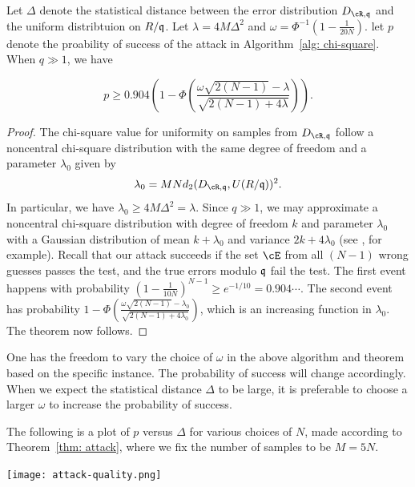 \documentclass{amsart}
\begin{document}
\begin{theorem} \label{thm: attack}
Let $\Delta$ denote the statistical distance between the error distribution $D_{\cR, \fq}$ and the uniform distribtuion on $R/\mathfrak{q}$. Let $\lambda = 4 M \Delta^2$ and $\omega = \Phi^{-1}(1- \frac{1}{20N})$. let $p$ denote the proability of success of the attack in Algorithm~\ref{alg: chi-square}. When $q \gg 1$, we have

$$p \geq 0.904 \left(1- \Phi \left(\frac{\omega \sqrt{2(N-1)}- \lambda}{\sqrt{2(N-1) +4\lambda}}\right) \right).$$
\end{theorem}

\begin{proof}
The chi-square value for uniformity on samples from $D_{\cR, \fq}$ follow a noncentral chi-square distribution with the same degree of freedom and a parameter $\lambda_0$ given by
\[
    \lambda_0 = MN d_2(D_{\cR, \fq}, U(R/\fq))^2.
\]
In particular, we have $\lambda_0 \geq  4M\Delta^2 = \lambda$. Since $q \gg 1$, we may approximate a noncentral chi-square distribution with degree of freedom $k$ and parameter $\lambda_0$ with a Gaussian distribution of mean $k + \lambda_0$ and variance $2k + 4\lambda_0$ (see \cite{ryabko2004new}, for example). Recall that our attack succeeds if the set $\cE$ from all $(N-1)$ wrong guesses passes the test, and the true errors modulo $\mathfrak{q}$ fail the test. The first event happens with probability $(1 - \frac{1}{10N})^{N-1} \geq e^{-1/10} = 0.904 \cdots$. The second event has probability $1 - \Phi \left(\frac{\omega \sqrt{2(N-1)}- \lambda_0}{\sqrt{2(N-1) +4\lambda_0}}\right) $, which is an increasing function in $\lambda_0$. The theorem now follows.
\end{proof}

\begin{remark}
One has the freedom to vary the choice of $\omega$ in the above algorithm and theorem based on the specific instance.
The probability of success will change accordingly. When we expect the statistical distance $\Delta$ to be large, it is preferable to choose a larger $\omega$ to increase the probability of success.
\end{remark}

The following is a plot of $p$ versus $\Delta$ for various choices of $N$, made according to Theorem~\ref{thm: attack}, where we fix the number of samples to be $M = 5N$.

\begin{center}
\texttt{[image: attack-quality.png]}
\end{center}
\end{document}
